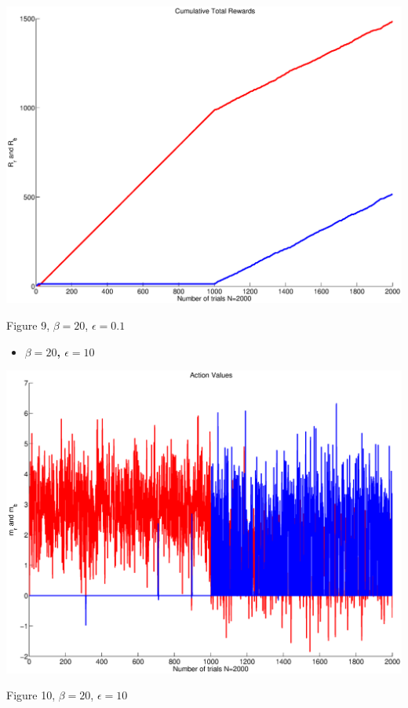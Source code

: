 \documentclass{article}
\begin{document}
\begin{center}
\includegraphics[width=\textwidth]{rew3.eps}
\begin{footnotesize}
 Figure 9, $\beta=20$, $\epsilon=0.1$
\end{footnotesize}
\end{center}

\newpage
\begin{itemize}
 \item \textbf{ $\beta=20$, $\epsilon=10$}
\end{itemize}

\begin{center}
\includegraphics[width=\textwidth]{action4.eps}
\begin{footnotesize}
 Figure 10, $\beta=20$, $\epsilon=10$
\end{footnotesize}
\end{center}
\end{document}
